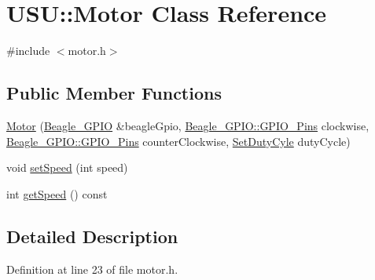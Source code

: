 \hypertarget{class_u_s_u_1_1_motor}{\section{\-U\-S\-U\-:\-:\-Motor \-Class \-Reference}
\label{class_u_s_u_1_1_motor}
}


{\ttfamily \#include $<$motor.\-h$>$}

\subsection*{\-Public \-Member \-Functions}
\begin{DoxyCompactItemize}
\item 
\hyperlink{class_u_s_u_1_1_motor_aefca8e50b8a3a246908a07d8b129a03b}{\-Motor} (\hyperlink{class_beagle___g_p_i_o}{\-Beagle\-\_\-\-G\-P\-I\-O} \&beagle\-Gpio, \hyperlink{class_beagle___g_p_i_o_a0806cf8c44549ab348c5f82197e23d9e}{\-Beagle\-\_\-\-G\-P\-I\-O\-::\-G\-P\-I\-O\-\_\-\-Pins} clockwise, \hyperlink{class_beagle___g_p_i_o_a0806cf8c44549ab348c5f82197e23d9e}{\-Beagle\-\_\-\-G\-P\-I\-O\-::\-G\-P\-I\-O\-\_\-\-Pins} counter\-Clockwise, \hyperlink{motor_8h_aa4a2cd53d0866ae4c273573db3c4870d}{\-Set\-Duty\-Cyle} duty\-Cycle)
\item 
void \hyperlink{class_u_s_u_1_1_motor_aa58cbc26a0da87389dd208367d0fa407}{set\-Speed} (int speed)
\item 
int \hyperlink{class_u_s_u_1_1_motor_a98d4c98ddc30e00485712f55b4a91211}{get\-Speed} () const 
\end{DoxyCompactItemize}


\subsection{\-Detailed \-Description}


\-Definition at line 23 of file motor.\-h.



